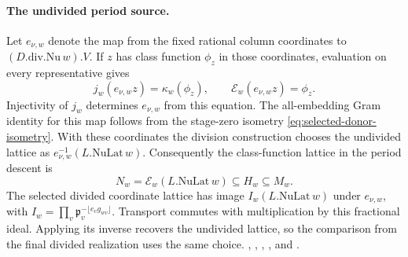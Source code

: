 \paragraph{The undivided period source.}
\leavevmode{}%
Let \(e_{\nu,w}\) denote the map from the fixed rational
column coordinates to \((D.\mathrm{div}.\mathrm{Nu}\,w).V\).
If \(z\) has class function \(\phi_z\) in those coordinates,
evaluation on every representative gives
\[
 j_w(e_{\nu,w}z)=\kappa_w(\phi_z),
 \qquad \mathcal E_w(e_{\nu,w}z)=\phi_z .
\]
Injectivity of \(j_w\) determines \(e_{\nu,w}\) from this equation.
The all-embedding Gram identity for this map follows from the
stage-zero isometry \eqref{eq:selected-donor-isometry}. With these
coordinates the division construction chooses the undivided lattice
as \(e_{\nu,w}^{-1}(L.\mathrm{NuLat}\,w)\). Consequently the
class-function lattice in the period descent is
\begin{equation}
\label{eq:selected-undivided-donor}
 N_w=\mathcal E_w(L.\mathrm{NuLat}\,w)
      \subseteq H_w\subseteq M_w .
\end{equation}
The selected divided coordinate lattice has image
\(I_w(L.\mathrm{NuLat}\,w)\) under \(e_{\nu,w}\), with
\(I_w=\prod_v\mathfrak p_v^{-\lfloor e_vg_{wv}\rfloor}\).
Transport commutes with multiplication by this fractional ideal.
Applying its inverse recovers the undivided lattice, so the
comparison from the final divided realization uses the same choice.
,
,
,
,
 and
.

